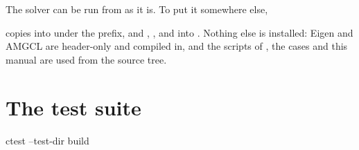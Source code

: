 The solver can be run from  as it is. To put it somewhere
else,


copies  into  under the prefix, and ,
,  and  into
. Nothing else is installed: Eigen and AMGCL are
header-only and compiled in, and the scripts of , the cases and
this manual are used from the source tree.

\section{The test suite}
\label{sec:install:tests}

\begin{shell}
ctest --test-dir build
\end{shell}

